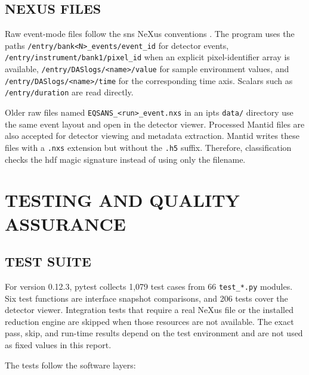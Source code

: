 \documentclass[tm]{ornltm}
\begin{document}
\subsection{NEXUS FILES}

Raw event-mode files follow the \ac{sns} NeXus conventions
\autocite{nexus}. The program uses the paths
\texttt{/entry/bank<N>\_events/event\_id} for detector events,
\texttt{/entry/instrument/bank1/pixel\_id} when an explicit pixel-identifier
array is available,
\texttt{/entry/DASlogs/<name>/value} for sample environment values, and
\texttt{/entry/DASlogs/<name>/time} for the corresponding time axis. Scalars such
as \texttt{/entry/duration} are read directly.

Older raw files named \texttt{EQSANS\_<run>\_event.nxs} in an \ac{ipts}
\texttt{data/} directory use the same event layout and open in the detector
viewer. Processed Mantid files are also accepted for detector viewing and metadata
extraction. Mantid writes these files with a \texttt{.nxs} extension but without
the \texttt{.h5} suffix. Therefore, classification checks the \ac{hdf} magic
signature instead of using only the filename.

\section{TESTING AND QUALITY ASSURANCE}
\label{sec:test}

\subsection{TEST SUITE}

For version 0.12.3, pytest collects 1,079 test cases from 66
\texttt{test\_*.py} modules. Six test functions are interface snapshot
comparisons, and 206 tests cover the detector viewer. Integration tests that require a real NeXus file or the installed
reduction engine are skipped when those resources are not available. The exact
pass, skip, and run-time results depend on the test environment and are not used
as fixed values in this report.

The tests follow the software layers:
\end{document}

